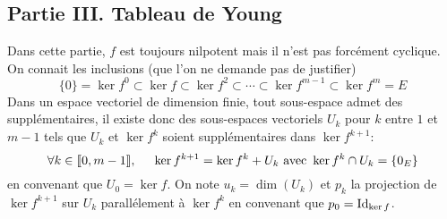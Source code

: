 \subsection*{Partie III. Tableau de Young}
Dans cette partie, $f$ est toujours nilpotent mais il n'est pas forcément cyclique. On connait les inclusions (que l'on ne demande pas de justifier)
\begin{displaymath}
 \{0\}=\ker f^0 \subset \ker f \subset \ker f^2 \subset \cdots \subset \ker f^{m-1} \subset \ker f^m = E
\end{displaymath}
Dans un espace vectoriel de dimension finie, tout sous-espace admet des supplémentaires, il existe donc des sous-espaces vectoriels $U_k$ pour $k$ entre $1$ et $m-1$ tels que $U_k$ et $\ker f^{k}$ soient supplémentaires dans $\ker f^{k+1}$:
\begin{displaymath}
 \forall k\in\llbracket 0, m-1\rrbracket,\hspace{0.5cm}
\ker f^{k+1} = \ker f^{k} + U_k \text{ avec  } \ker f^{k} \cap U_k = \{0_E\}
\end{displaymath}
en convenant que $U_0=\ker f$. On note $u_k=\dim (U_k)$ et $p_k$ la projection de $\ker f^{k+1}$ sur $U_k$ parallélement à $\ker f^{k}$ en convenant que $p_0=\operatorname{Id}_{\ker f}$.
